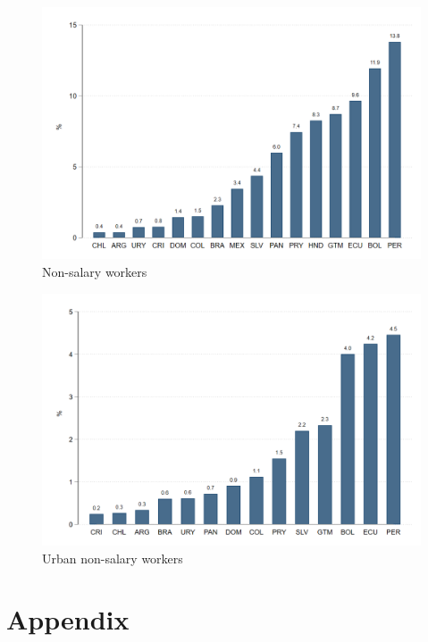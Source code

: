 \documentclass[english]{article}
\begin{document}
 \begin{figure}[H]
        \justifying
        \caption{Non-salary workers}     
       \centerline{\includegraphics[scale=.3]{latex/figures/Snapshot/Non_salary_share.png}}
        \label{fig:Nonsalarycosts}
       
 \end{figure}

  \begin{figure}[H]
        \justifying
        \caption{Urban non-salary workers}     
       \centerline{\includegraphics[scale=.3]{latex/figures/Snapshot/Urban_non_salary_share.png}}
        \label{fig:Nonsalarycosts}
       
 \end{figure}

 


\newpage
\section{Appendix}
\end{document}
